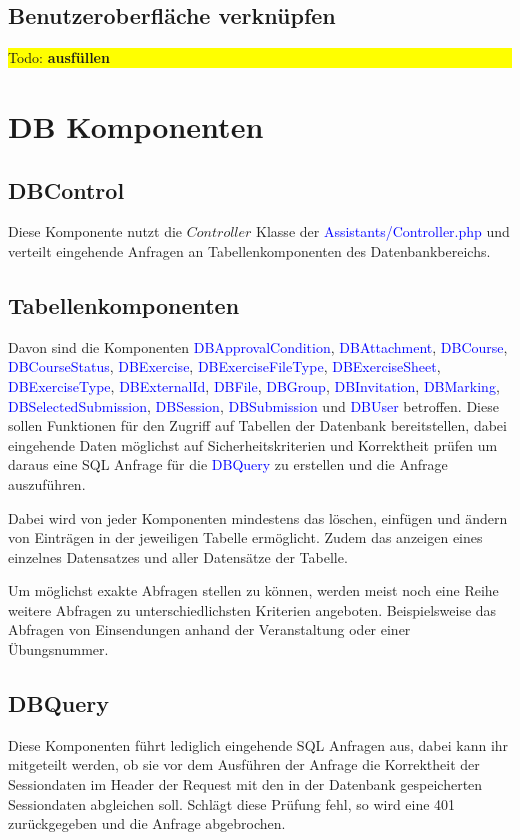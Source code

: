\documentclass[10pt,a4paper,final,parskip]{scrartcl}
\newcommand{\blau}[1]{\textcolor{blue}{#1}}
\newcommand{\todo}[1]{\colorbox{yellow}{\parbox{\textwidth}{Todo: \textbf{#1}}}}
\begin{document}
\subsection{Benutzeroberfläche verknüpfen}
\todo{ausfüllen}




 


\section{DB Komponenten}


\subsection{DBControl}
Diese Komponente nutzt die $Controller$ Klasse der \blau{Assistants/Controller.php} und verteilt eingehende Anfragen an Tabellenkomponenten des Datenbankbereichs.

\subsection{Tabellenkomponenten}
Davon sind die Komponenten \blau{DBApprovalCondition}, \blau{DBAttachment}, \blau{DBCourse}, \blau{DBCourseStatus}, \blau{DBExercise}, \blau{DBExerciseFileType}, \blau{DBExerciseSheet}, \blau{DBExerciseType}, \blau{DBExternalId}, \blau{DBFile}, \blau{DBGroup}, \blau{DBInvitation}, \blau{DBMarking}, \blau{DBSelectedSubmission}, \blau{DBSession}, \blau{DBSubmission} und \blau{DBUser} betroffen. Diese sollen Funktionen für den Zugriff auf Tabellen der Datenbank bereitstellen, dabei eingehende Daten möglichst auf Sicherheitskriterien und Korrektheit prüfen um daraus eine SQL Anfrage für die \blau{DBQuery} zu erstellen und die Anfrage auszuführen.

Dabei wird von jeder Komponenten mindestens das löschen, einfügen und ändern von Einträgen in der jeweiligen Tabelle ermöglicht. Zudem das anzeigen eines einzelnes Datensatzes und aller Datensätze der Tabelle.

Um möglichst exakte Abfragen stellen zu können, werden meist noch eine Reihe weitere Abfragen zu unterschiedlichsten Kriterien angeboten. Beispielsweise das Abfragen von Einsendungen anhand der Veranstaltung oder einer Übungsnummer.

\subsection{DBQuery}
Diese Komponenten führt lediglich eingehende SQL Anfragen aus, dabei kann ihr mitgeteilt werden, ob sie vor dem Ausführen der Anfrage die Korrektheit der Sessiondaten im Header der Request mit den in der Datenbank gespeicherten Sessiondaten abgleichen soll. Schlägt diese Prüfung fehl, so wird eine 401 zurückgegeben und die Anfrage abgebrochen. 
\end{document}
